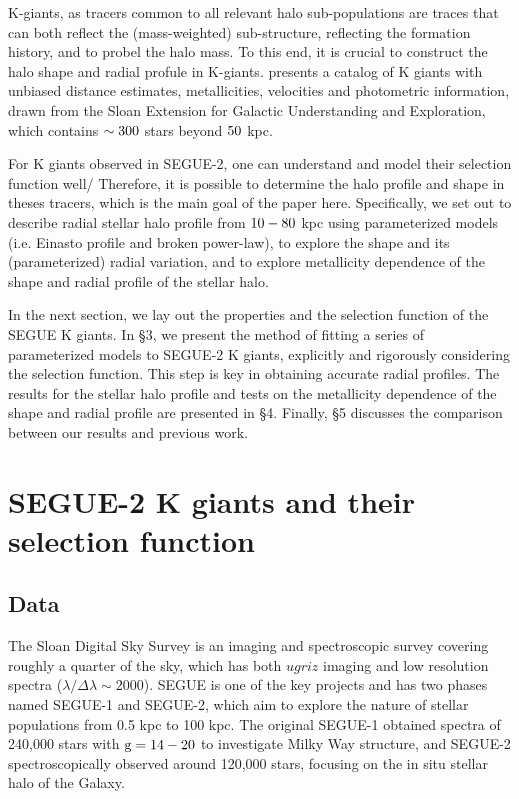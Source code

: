 \documentclass[12pt,preprint]{aastex}
\begin{document}
K-giants, as tracers common to all relevant halo sub-populations are traces that can both reflect the (mass-weighted) sub-structure, reflecting the formation history, and to probel the halo mass. To this end, it is crucial to construct the halo shape and radial profule in K-giants. \citet{Xue2014} presents a catalog of K giants with unbiased distance estimates, metallicities, velocities and photometric information, drawn from the Sloan Extension for Galactic Understanding and Exploration\citep[][SEGUE]{Yanny2009b}, which contains $\rm \sim 300$ stars beyond $\rm 50~$kpc. 

For K giants observed in SEGUE-2, one can understand and model their selection function well/ Therefore,  it is possible to determine the halo profile and shape in theses tracers, which is the main goal of the paper here. 
Specifically, we set out to describe radial stellar halo profile from $\rm 10-80~$kpc using parameterized models (i.e. Einasto profile and broken power-law), to explore the shape and its (parameterized) radial variation, and to explore metallicity dependence of the shape and radial profile of the stellar halo.   

In the next section, we lay out the properties and the selection function of the SEGUE K giants. In \S 3, we present the method of fitting a series of parameterized models to SEGUE-2 K giants, explicitly and rigorously considering the selection function. This step is key in obtaining accurate radial profiles. The results for the stellar halo profile and tests on the metallicity dependence of the shape and radial profile are presented in \S 4. Finally, \S 5 discusses the comparison between our results and previous work.


\section{SEGUE-2 K giants and their selection function}
\subsection{Data}
The Sloan Digital Sky Survey\citep[SDSS;][]{York2000} is an imaging and spectroscopic survey covering roughly a quarter of the sky, which has both $ugriz$ imaging \citep{Fukugita1996, Gunn1998, Stoughton2002, Pier2003, Eisenstein2011} and low resolution spectra ($\lambda/\Delta \lambda \sim 2000$). SEGUE is one of
the key projects and has two phases named SEGUE-1 and SEGUE-2, which aim to explore the nature of stellar populations from 0.5 kpc to 100 kpc\citep[][and Rockosi et al. in prep.]{Yanny2009b}. The original SEGUE-1 obtained spectra of 240,000 stars with $\rm g=14-20$ to investigate Milky Way structure, and SEGUE-2 spectroscopically observed around 120,000 stars, focusing on the in situ stellar halo of the Galaxy.
\end{document}
